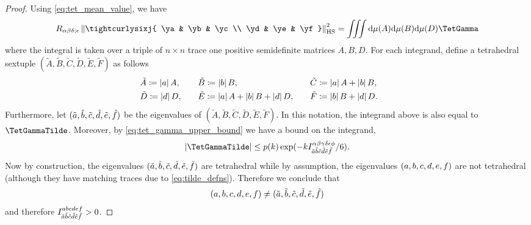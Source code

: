 \documentclass[notitlepage, 10pt]{article}
\begin{document}
\begin{proof}
    Using \cref{eq:tet_mean_value}, we have
    \begin{align}
        R_{\ya\yb\yd;\ye}\norm{\tightcurlysixj{ \ya & \yb & \yc \\ \yd & \ye & \yf}}_{\mathrm{HS}}^2 
        =
        \iiint \diff \mu(A)\diff \mu(B)\diff \mu(D)\TetGamma
    \end{align}
    where the integral is taken over a triple of $n\times n$ trace one positive semidefinite matrices $A, B, D$.
    For each integrand, define a tetrahedral sextuple $(\tilde A,\tilde B,\tilde C,\tilde D,\tilde E,\tilde F)$ as follows
    \begin{equation}
        \label{eq:tilde_defns}
        \begin{alignedat}{3}
            &\tilde A \coloneqq \left|a\right|A, \qquad 
            &&\tilde B \coloneqq \left|b\right|B, \qquad 
            &&\tilde C \coloneqq \left|a\right|A+\left|b\right|B, \qquad \\
            &\tilde D \coloneqq \left|d\right|D, \qquad 
            &&\tilde E \coloneqq \left|a\right|A+\left|b\right|B+\left|d\right|D, \qquad 
            &&\tilde F \coloneqq \left|b\right|B + \left|d\right|D.
        \end{alignedat}
    \end{equation} 
    Furthermore, let $(\tilde {a}, \tilde {b}, \tilde {c}, \tilde {d}, \tilde {e}, \tilde {f})$ be the eigenvalues of $(\tilde A, \tilde B, \tilde C, \tilde D, \tilde E, \tilde F)$.
    In this notation, the integrand above is also equal to $\TetGammaTilde$.
    Moreover, by \cref{eq:tet_gamma_upper_bound} we have a bound on the integrand,
    \begin{equation}
        \abs{\TetGammaTilde} \leq p(k) \exp(-k I^{\ya\yb\yc\yd\ye\yf}_{\tilde \ea \tilde \eb\tilde \ec\tilde \ed\tilde \ee\tilde \ef}/6).
    \end{equation}
    Now by construction, the eigenvalues $(\tilde {a}, \tilde {b}, \tilde {c}, \tilde {d}, \tilde {e}, \tilde {f})$ are tetrahedral while by assumption, the eigenvalues $(a, b, c, d, e, f)$ are not tetrahedral (although they have matching traces due to \cref{eq:tilde_defns}).
    Therefore we conclude that
    \begin{equation}
        (a, b, c, d, e, f) \neq (\tilde {a}, \tilde {b}, \tilde {c}, \tilde {d}, \tilde {e}, \tilde {f})
    \end{equation}
    and therefore $I_{\tilde {a}\tilde {b}\tilde {c}\tilde {d}\tilde {e}\tilde {f}}^{abcdef} > 0$.


\end{proof}
\end{document}

